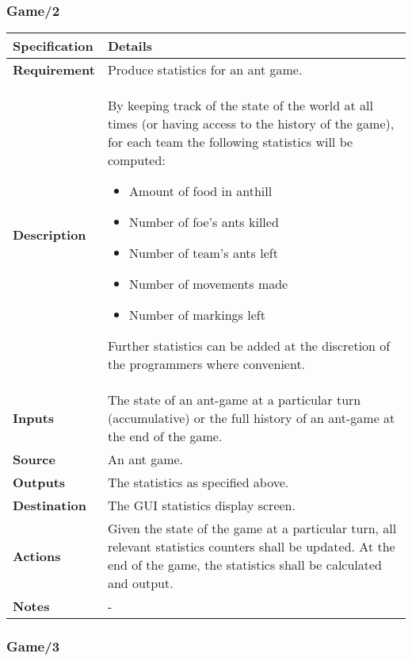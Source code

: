 \documentclass[11pt]{article}
\begin{document}
\subsubsection*{Game/2}\label{game2}

\begin{longtable}[c]{@{\extracolsep{\fill}}|p{}|p{}|@{}}
\hline
\textbf{Specification} & \textbf{Details}\tabularnewline
\hline
\textbf{Requirement} & Produce statistics for an ant game.\tabularnewline
\textbf{Description} & By keeping track of the state of the
world at all times (or having access to the history of the game), for
each team the following statistics will be computed: \begin{itemize}
 \item Amount of food in anthill
 \item Number of foe's ants killed
 \item Number of team's ants left
 \item Number of movements made
 \item Number of markings left
 \end{itemize} Further statistics can be added at the discretion of the programmers
where convenient.\tabularnewline
\textbf{Inputs} & The state of an ant-game at a particular turn (accumulative) or the full
history of an ant-game at the end of the game.\tabularnewline
\textbf{Source} & An ant game.\tabularnewline
\textbf{Outputs} & The statistics as specified above.\tabularnewline
\textbf{Destination} & The GUI statistics
display screen.\tabularnewline
\textbf{Actions} & Given the state of the game at a particular turn, all relevant statistics counters shall be updated. At the end of the game, the statistics shall be calculated and output. \tabularnewline
\textbf{Notes} & -\tabularnewline
\hline
\end{longtable}

\subsubsection*{Game/3}\label{game3}
\end{document}
